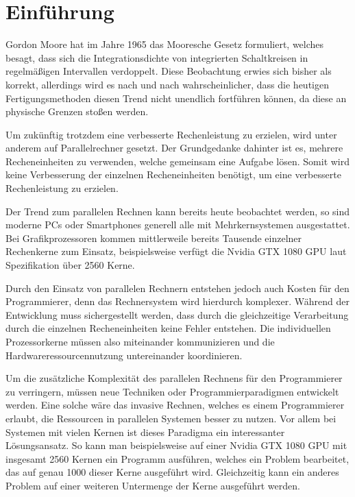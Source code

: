 \chapter{Einführung}\label{sec:intro}

Gordon Moore hat im Jahre 1965 das Mooresche Gesetz formuliert, welches besagt, dass sich die Integrationsdichte
von integrierten Schaltkreisen in regelmäßigen Intervallen verdoppelt\cite{mooresLawPastPresentFuture}.
Diese Beobachtung erwies sich bisher als korrekt, allerdings wird es nach und nach wahrscheinlicher,
dass die heutigen Fertigungsmethoden diesen Trend nicht unendlich fortführen können, da diese an
physische Grenzen stoßen werden.\cite{endOfMooresLaw}

Um zukünftig trotzdem eine verbesserte Rechenleistung zu erzielen, wird unter anderem auf Parallelrechner gesetzt.
Der Grundgedanke dahinter ist es, mehrere Recheneinheiten zu verwenden, welche gemeinsam eine Aufgabe
lösen. Somit wird keine Verbesserung der einzelnen Recheneinheiten benötigt, um eine verbesserte Rechenleistung
zu erzielen.

Der Trend zum parallelen Rechnen kann bereits heute beobachtet werden,
so sind moderne PCs oder Smartphones generell alle mit Mehrkernsystemen ausgestattet.
Bei Grafikprozessoren kommen mittlerweile bereits Tausende einzelner Rechenkerne zum Einsatz,
beispielsweise verfügt die Nvidia GTX 1080 GPU laut Spezifikation \cite{nvidia1080specs} über 2560 Kerne.

Durch den Einsatz von parallelen Rechnern entstehen jedoch auch Kosten für den Programmierer,
denn das Rechnersystem wird hierdurch komplexer.
Während der Entwicklung muss sichergestellt werden, dass durch die gleichzeitige Verarbeitung durch die einzelnen
Recheneinheiten keine Fehler entstehen. Die individuellen Prozessorkerne müssen also miteinander
kommunizieren und die Hardwareressourcennutzung untereinander koordinieren.

Um die zusätzliche Komplexität des parallelen Rechnens für den Programmierer zu verringern,
müssen neue Techniken oder Programmierparadigmen entwickelt werden.
Eine solche wäre das invasive Rechnen, welches es einem Programmierer erlaubt,
die Ressourcen in parallelen Systemen besser zu nutzen.
Vor allem bei Systemen mit vielen Kernen ist dieses Paradigma ein interessanter Lösungsansatz.
So kann man beispielsweise auf einer Nvidia GTX 1080 GPU mit insgesamt 2560 Kernen ein Programm
ausführen, welches ein Problem bearbeitet, das auf genau 1000 dieser Kerne ausgeführt wird.
Gleichzeitig kann ein anderes Problem auf einer weiteren Untermenge der Kerne ausgeführt werden.

